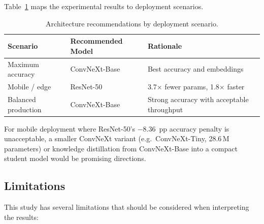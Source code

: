 Table~\ref{tab:deployment} maps the experimental results to deployment
scenarios.

\begin{table}[ht]
\centering
\caption{Architecture recommendations by deployment scenario.}
\label{tab:deployment}
\begin{tabular}{lll}
\toprule
\textbf{Scenario} & \textbf{Recommended Model} & \textbf{Rationale} \\
\midrule
Maximum accuracy     & ConvNeXt-Base & Best accuracy and embeddings \\
Mobile / edge        & ResNet-50     & 3.7$\times$ fewer params, 1.8$\times$ faster \\
Balanced production  & ConvNeXt-Base & Strong accuracy with acceptable throughput \\
\bottomrule
\end{tabular}
\end{table}

For mobile deployment where ResNet-50's $-8.36$~pp accuracy penalty is
unacceptable, a smaller ConvNeXt variant (e.g.\ ConvNeXt-Tiny, 28.6\,M
parameters) or knowledge distillation from ConvNeXt-Base into a compact
student model would be promising directions.

\subsection{Limitations}\label{sec:limitations}

This study has several limitations that should be considered when
interpreting the results:

